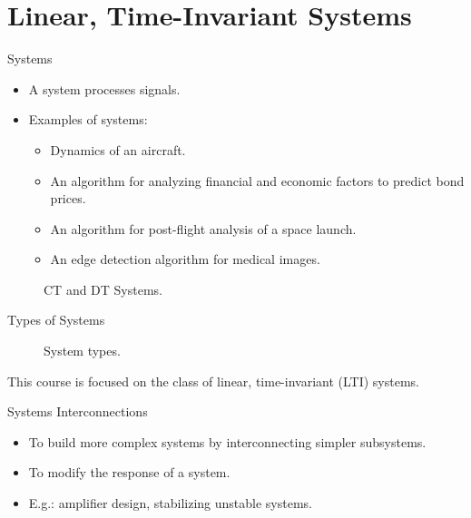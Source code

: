 \section{Linear, Time-Invariant Systems}
\begin{frame}{Systems}
    \begin{itemize}[<+->]
        \item A system processes signals.
        \item Examples of systems:
            \begin{itemize}
                \item Dynamics of an aircraft.
                \item An algorithm for analyzing financial and economic factors to predict bond prices.
                \item An algorithm for post-flight analysis of a space launch.
                \item An edge detection algorithm for medical images.
            \end{itemize}
    \end{itemize}

\begin{figure}
    \centering
        
        
    \caption{CT and DT Systems.}\label{fi:ct_dt_systems}
\end{figure}


\end{frame}

\begin{frame}[plain]{Types of Systems}
    \begin{figure}
        \centering
        
        \caption{System types.}\label{fi:system_types}
    \end{figure}
    This course is focused on the class of linear, time-invariant (LTI) systems.
\end{frame}


\begin{frame}{Systems Interconnections}
    \begin{itemize}
      \item To build more complex systems by interconnecting simpler subsystems.
      \item To modify the response of a system.
      \item E.g.: amplifier design, stabilizing unstable systems.
    \end{itemize}
\end{frame}

